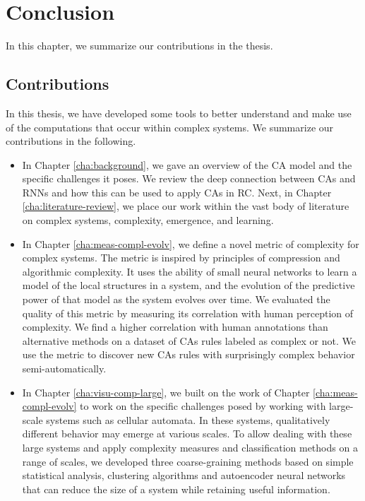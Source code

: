 \chapter{Conclusion}\label{cha:conclusion}

In this chapter, we summarize our contributions in the thesis.

\section{Contributions}

In this thesis, we have developed some tools to better understand and make use
of the computations that occur within complex systems.
We summarize our contributions in the following.

\begin{itemize}
  \item In Chapter \ref{cha:background}, we gave an overview of the \acf{CA}
        model and the specific challenges it poses. We review the deep
        connection between \acp{CA} and \acfp{RNN} and how this can be used to apply
        \acp{CA} in \acf{RC}. Next, in Chapter \ref{cha:literature-review}, we
        place our work within the vast body of literature on complex systems,
        complexity, emergence, and learning.

  \item In Chapter \ref{cha:meas-compl-evolv}, we define a novel metric of
        complexity for complex systems. The metric is inspired by principles of
        compression and algorithmic complexity. It uses the ability of small
        neural networks to learn a model of the local structures in a system,
        and the evolution of the predictive power of that model as the system
        evolves over time. We evaluated the quality of this metric by measuring
        its correlation with human perception of complexity. We find a
        higher correlation with human annotations than alternative methods on a
        dataset of \acp{CA} rules labeled as complex or not. We use the metric
        to discover new \acp{CA} rules with surprisingly complex behavior
        semi-automatically.

  \item In Chapter \ref{cha:visu-comp-large}, we built on the work of Chapter
        \ref{cha:meas-compl-evolv} to work on the specific challenges posed by
        working with large-scale systems such as cellular automata. In these
        systems, qualitatively different behavior may emerge at various scales.
        To allow dealing with these large systems and apply complexity measures
        and classification methods on a range of scales, we developed three
        coarse-graining methods based on simple statistical analysis, clustering
        algorithms and autoencoder neural networks that can reduce the size of
        a system while retaining useful information.


\end{itemize}

